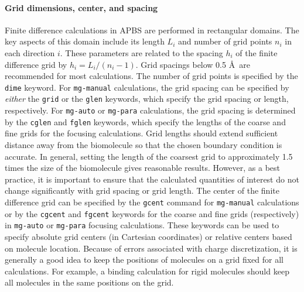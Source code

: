 \documentclass[12pt,titlepage]{article}
\newcommand{\keyword}[1]{\texttt{#1}}
\begin{document}
\paragraph{Grid dimensions, center, and spacing}
Finite difference calculations in APBS are performed in rectangular domains.  
The key aspects of this domain include its length $L_i$ and number of grid points $n_i$ in each direction $i$.
These parameters are related to the spacing $h_i$ of the finite difference grid by $h_i = L_i/(n_i-1)$.
Grid spacings below 0.5 \AA\ are recommended for most calculations.
The number of grid points is specified by the \keyword{dime} keyword.
For \keyword{mg-manual} calculations, the grid spacing can be specified by \emph{either} the \keyword{grid} or the \keyword{glen} keywords, which specify the grid spacing or length, respectively.
For \keyword{mg-auto} or \keyword{mg-para} calculations, the grid spacing is determined by the \keyword{cglen} and \keyword{fglen} keywords, which specify the lengths of the coarse and fine grids for the focusing calculations.
Grid lengths should extend sufficient distance away from the biomolecule so that the chosen boundary condition is accurate. 
In general, setting the length of the coarsest grid to approximately 1.5 times the size of the biomolecule gives reasonable results.
However, as a best practice, it is important to ensure that the calculated quantities of interest do not change significantly with grid spacing or grid length.
The center of the finite difference grid can be specified by the \keyword{gcent} command for \keyword{mg-manual} calculations or by the \keyword{cgcent} and \keyword{fgcent} keywords for the coarse and fine grids (respectively) in \keyword{mg-auto} or \keyword{mg-para} focusing calculations.
These keywords can be used to specify absolute grid centers (in Cartesian coordinates) or relative centers based on molecule location.
Because of errors associated with charge discretization, it is generally a good idea to keep the positions of molecules on a grid fixed for all calculations.
For example, a binding calculation for rigid molecules should keep all molecules in the same positions on the grid.
\end{document}
